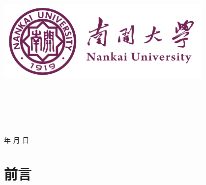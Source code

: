 \documentclass[a4paper]{article}
\newcommand{\HRule}{\rule{\linewidth}{0.5mm}}%
\begin{document}
\renewcommand{\contentsname}{目\ 录}
\renewcommand{\appendixname}{附录}
\renewcommand{\appendixpagename}{附录}
\renewcommand{\refname}{参考文献} 
\renewcommand{\figurename}{图}
\renewcommand{\tablename}{表}
\renewcommand{\today}{\number\year 年 \number\month 月 \number\day 日}

\begin{titlepage}
    \begin{center}
    \includegraphics[width=0.8\textwidth]{NKU.png}\\[1cm]
    \vspace{20mm}
		\textbf{\huge\textbf{}}\\[0.5cm]
		\textbf{\huge{}}\\[2.3cm]
		\textbf{\Huge\textbf{}}

		\vspace{\fill}
    
    \centering
    \textsc{\LARGE {}}\\[0.5cm]
    \textsc{\LARGE {}}\\[0.5cm]
    \textsc{\LARGE {}}\\[0.5cm]
    
    \vfill
    {\Large \today}
    \end{center}
\end{titlepage}

\renewcommand {\thefigure}{\thesection{}.\arabic{figure}}%
\renewcommand{\figurename}{图}
\renewcommand{\contentsname}{目录}  


\clearpage
\tableofcontents
\newpage

\section{前言}
\end{document}
